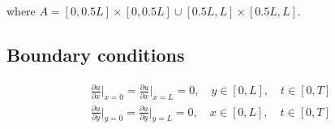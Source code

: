 \documentclass{article}
\begin{document}
where $A=[0,0.5L]\times[0,0.5L]\cup[0.5L,L]\times[0.5L,L]$.

\subsection{Boundary conditions}

\begin{equation}
    \begin{split}
        \frac{\partial u}{\partial x}\Big|_{x=0}=\frac{\partial u}{\partial x}\Big|_{x=L}=0,\quad y\in[0,L],\quad t\in[0,T]\\
        \frac{\partial u}{\partial y}\Big|_{y=0}=\frac{\partial u}{\partial y}\Big|_{y=L}=0,\quad x\in[0,L],\quad t\in[0,T]\\
    \end{split}
\end{equation}
\end{document}

